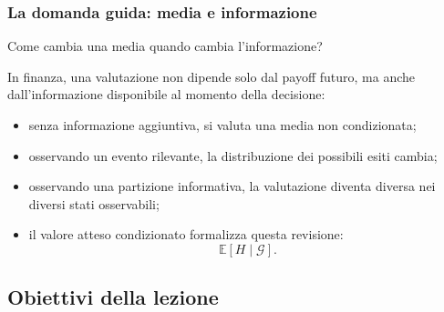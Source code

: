 \documentclass[handout]{beamer}%
\newenvironment{stepitemize}{\begin{itemize}[<+->]}{\end{itemize} }
\providecommand{\E}{\mathbb{E}}
\providecommand{\G}{\mathcal{G}}
\providecommand{\1}{\mathbf{1}}
\providecommand{\QTR}[2]{\csname #1\endcsname{#2}}
\begin{document}
\begin{frame}%
%

\frametitle{La domanda guida: media e informazione}%
%

%


\begin{center}
{\Large Come cambia una media quando cambia l'informazione?}
\end{center}

\medskip

In finanza, una valutazione non dipende solo dal payoff futuro, ma anche
dall'informazione disponibile al momento della decisione:

\medskip

\begin{stepitemize}
\item senza informazione aggiuntiva, si valuta una media non condizionata;

\item osservando un evento rilevante, la distribuzione dei possibili esiti cambia;

\item osservando una partizione informativa, la valutazione diventa diversa
nei diversi stati osservabili;

\item il valore atteso condizionato formalizza questa revisione:
\[
\E[H\mid\G].
\]

\end{stepitemize}

\medskip%

\transboxout
\end{frame}%


\subsection{Obiettivi della lezione}
\end{document}
